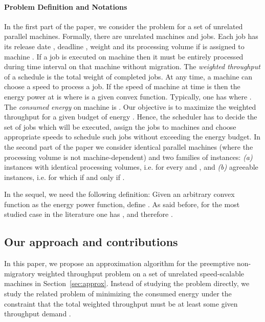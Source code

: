 \documentclass[11pt,a4paper]{article}
\begin{document}
\paragraph{Problem Definition and Notations} In the first part of the paper, we consider the problem for a set of unrelated parallel machines.
Formally, there are  unrelated machines and  jobs. Each job  has its release date , deadline ,
weight  and its processing volume  if  is assigned to machine . If a job is executed on 
machine  then it must be entirely processed during time interval  on that machine without migration. 
The \emph{weighted throughput} of a schedule is the total weight of completed jobs.  
At any time, a machine can choose a speed to process a job. If the speed of machine  at time  is 
 then the energy power at  is  where  is a given convex function.
Typically, one has  where . The \emph{consumed energy} 
on machine  is . 
Our objective is to maximize the weighted throughput for a given budget of energy .
Hence, the scheduler has to decide the set of jobs which will be executed, assign the 
jobs to machines and choose appropriate speeds to schedule such jobs without exceeding 
the energy budget.  
In the second part of the paper we consider identical parallel machines (where the processing volume is not machine-dependent) and two  families of instances: {\em (a)} instances with identical processing volumes, i.e.  for every  and , and {\em (b)} agreeable instances, i.e. for which  if and only if .

In the sequel, we need the following definition: Given an arbitrary convex function  as the energy power function, define 
. As said before, for the most studied case in the literature one has , and therefore 
. 




\subsection{Our approach and contributions}
In this paper, we propose an approximation algorithm for the preemptive non-migratory
weighted throughput problem
on a set of unrelated speed-scalable machines in Section~\ref{sec:approx}. 
Instead of studying the problem directly, 
we study the related problem of minimizing the consumed energy 
under the constraint that the total weighted throughput must be at least some given 
throughput demand .
 
\end{document}
